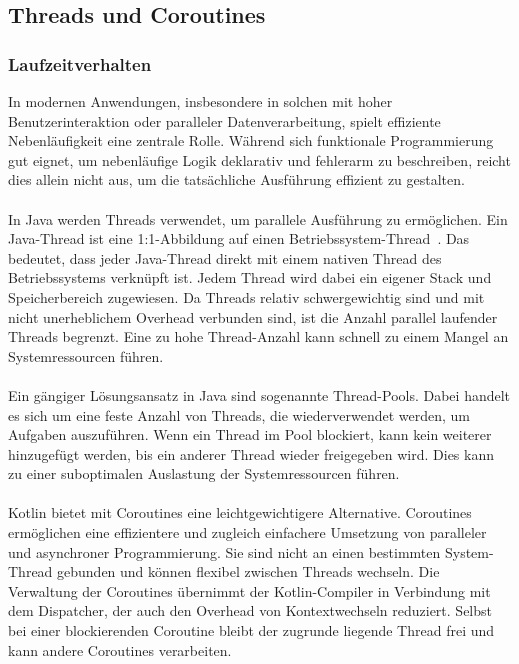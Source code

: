 \documentclass[11pt]{article}
\begin{document}
    \subsection{Threads und Coroutines}

    \subsubsection{Laufzeitverhalten}

    In modernen Anwendungen, insbesondere in solchen mit hoher Benutzerinteraktion oder paralleler Datenverarbeitung, spielt effiziente Nebenläufigkeit eine zentrale Rolle.
    Während sich funktionale Programmierung gut eignet, um nebenläufige Logik deklarativ und fehlerarm zu beschreiben, reicht dies allein nicht aus, um die tatsächliche Ausführung effizient zu gestalten.\\
    \\
    In Java werden Threads verwendet, um parallele Ausführung zu ermöglichen.
    Ein Java-Thread ist eine 1:1-Abbildung auf einen Betriebssystem-Thread~\cite[940]{insel}.
    Das bedeutet, dass jeder Java-Thread direkt mit einem nativen Thread des Betriebssystems verknüpft ist.
    Jedem Thread wird dabei ein eigener Stack und Speicherbereich zugewiesen.
    Da Threads relativ schwergewichtig sind und mit nicht unerheblichem Overhead verbunden sind, ist die Anzahl parallel laufender Threads begrenzt.
    Eine zu hohe Thread-Anzahl kann schnell zu einem Mangel an Systemressourcen führen.\\
    \\
    Ein gängiger Lösungsansatz in Java sind sogenannte Thread-Pools.
    Dabei handelt es sich um eine feste Anzahl von Threads, die wiederverwendet werden, um Aufgaben auszuführen.
    Wenn ein Thread im Pool blockiert, kann kein weiterer hinzugefügt werden, bis ein anderer Thread wieder freigegeben wird.
    Dies kann zu einer suboptimalen Auslastung der Systemressourcen führen.\\
    \\
    Kotlin bietet mit Coroutines eine leichtgewichtigere Alternative.
    Coroutines ermöglichen eine effizientere und zugleich einfachere Umsetzung von paralleler und asynchroner Programmierung.
    Sie sind nicht an einen bestimmten System-Thread gebunden und können flexibel zwischen Threads wechseln.
    Die Verwaltung der Coroutines übernimmt der Kotlin-Compiler in Verbindung mit dem Dispatcher, der auch den Overhead von Kontextwechseln reduziert.
    Selbst bei einer blockierenden Coroutine bleibt der zugrunde liegende Thread frei und kann andere Coroutines verarbeiten.
\end{document}
